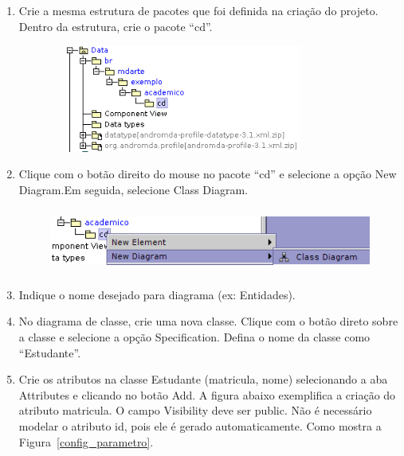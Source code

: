 \begin{enumerate}
\item Crie a mesma estrutura de pacotes que foi definida na criação do projeto.
Dentro da estrutura, crie o pacote “cd”.
\begin{figure}[!htb]
	\centering
	\includegraphics[width=250pt,height=100pt]{imgs/tutorial-mdarte-0000.png}
\end{figure}
\item Clique com o botão direito do mouse no pacote “cd” e selecione a opção New
Diagram.Em seguida, selecione Class Diagram.
\begin{figure}[!htb]
	\centering
	\includegraphics[width=400pt,height=60pt]{imgs/tutorial-mdarte-0001.png}
\end{figure}
	
\item Indique o nome desejado para diagrama (ex: Entidades).
	
\item No diagrama de classe, crie uma nova classe. Clique com o botão direto sobre a classe e selecione a opção Specification. Defina o nome da classe como “Estudante”.
	
\item Crie os atributos na classe Estudante (matricula, nome) selecionando a aba Attributes e clicando no botão Add. A figura abaixo exemplifica a criação do atributo matricula. O campo Visibility deve ser public. Não é necessário modelar o atributo id, pois ele é gerado automaticamente. Como mostra a Figura~\ref{config_parametro}.


\end{enumerate}
